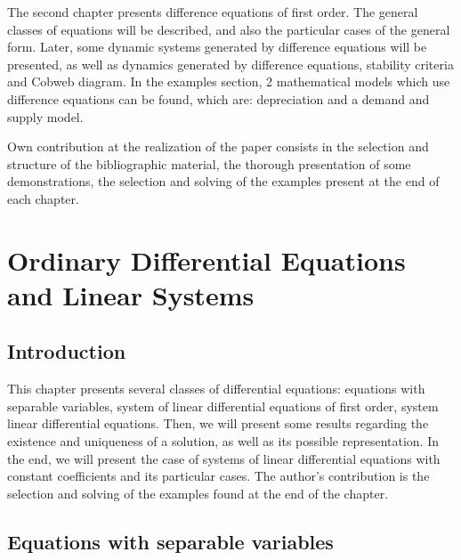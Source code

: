 \documentclass[a4paper, 11pt]{report}
\begin{document}
The second chapter presents difference equations of first order. The general classes of equations will be described, and also the particular cases of the general form. Later, some dynamic systems generated by difference equations will be presented, as well as dynamics generated by difference equations, stability criteria and Cobweb diagram. In the examples section, 2 mathematical models which use difference equations can be found, which are: depreciation and a demand and supply model.\par
Own contribution at the realization of the paper consists in the selection and structure of the bibliographic material, the thorough presentation of some demonstrations, the selection and solving of the examples present at the end of each chapter.

 


 \chapter{Ordinary Differential Equations and Linear Systems}
 \section{Introduction}
 This chapter presents several classes of differential equations: equations with separable variables, system of linear differential equations of first order, system linear differential equations. Then, we will present some results regarding the existence and uniqueness of a solution, as well as its possible representation. In the end, we will present the case of systems of linear differential equations with constant coefficients and its particular cases.
 The author's contribution is the selection and solving of the examples found at the end of the chapter.
 \section{Equations with separable variables}\label{1.1.1}
\end{document}
